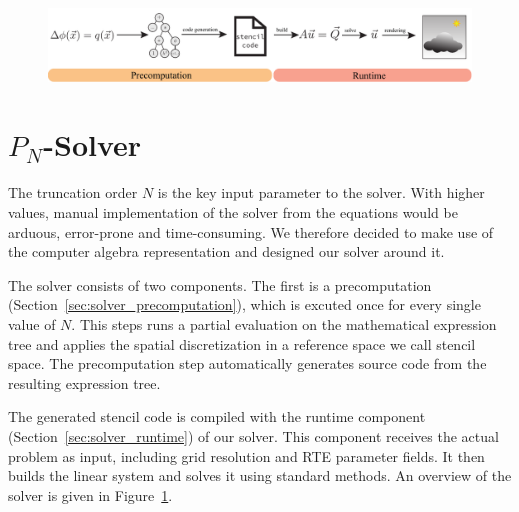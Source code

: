 \begin{figure}[t!]
\centering
\includegraphics[width=\textwidth]{figures/fig_pipeline.pdf}
\vspace{-0.2in}
\label{fig:pnsolver}
\end{figure}

\vspace{-0.75in}

\section{$P_N$-Solver}
\label{sec:pnsolver}

The truncation order $N$ is the key input parameter to the solver. With higher values, manual implementation of the solver from the equations would be arduous, error-prone and time-consuming. We therefore decided to make use of the computer algebra representation and designed our solver around it.

The solver consists of two components. The first is a precomputation (Section~\ref{sec:solver_precomputation}), which is excuted once for every single value of $N$. This steps runs a partial evaluation on the mathematical expression tree and applies the spatial discretization in a reference space we call stencil space. The precomputation step automatically generates source code from the resulting expression tree.

The generated stencil code is compiled with the runtime component (Section~\ref{sec:solver_runtime}) of our solver. This component receives the actual problem as input, including grid resolution and RTE parameter fields. It then builds the linear system and solves it using standard methods. An overview of the solver is given in Figure~\ref{fig:pnsolver}.




